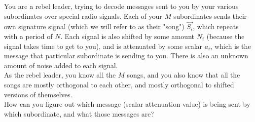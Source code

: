 




You are a rebel leader, trying to decode messages sent to you by your various subordinates over special radio signals. Each of your $M$ subordinates sends their own signature signal (which we will refer to as their "song") $\vec{S_i}$, which repeats with a period of $N$. Each signal is also shifted by some amount $N_i$ (because the signal takes time to get to you), and is attenuated by some scalar $a_i$, which is the message that particular subordinate is sending to you. There is also an unknown amount of noise added to each signal. \\

As the rebel leader, you know all the $M$ songs, and you also know that all the songs are mostly orthogonal to each other, and mostly orthogonal to shifted versions of themselves. \\

How can you figure out which message (scalar attenuation value) is being sent by which subordinate, and what those messages are?




